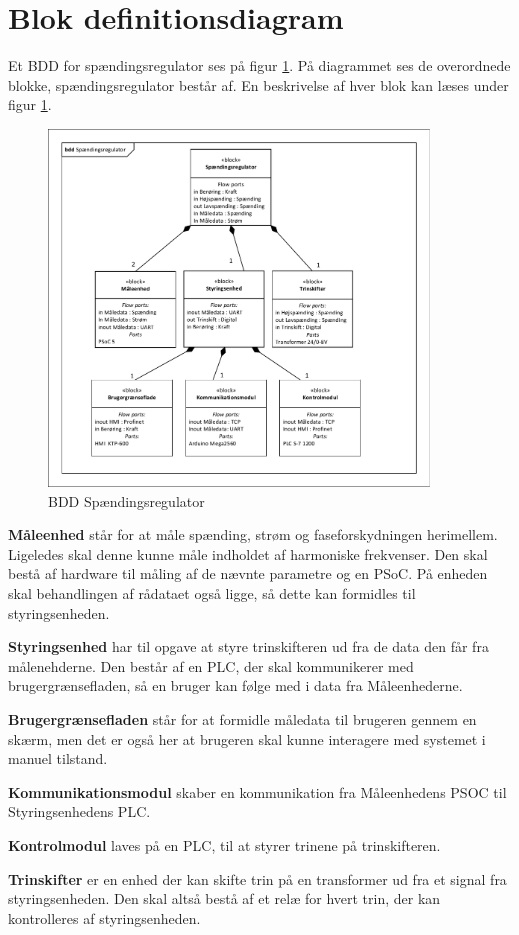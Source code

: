 
\section{Blok definitionsdiagram}
Et BDD for spændingsregulator ses på figur \ref{fig:BDDSpaendingsregulator}. På diagrammet ses de overordnede blokke, spændingsregulator består af. En beskrivelse af hver blok kan læses under figur \ref{fig:BDDSpaendingsregulator}.

\begin{figure}[htbp] %
	\centering
	\includegraphics[width=0.9\textwidth]{Figure/BDDSpaendingsregulator}
	\caption{BDD Spændingsregulator}
	\label{fig:BDDSpaendingsregulator}
\end{figure}

\textbf{Måleenhed} står for at måle spænding, strøm og faseforskydningen herimellem. Ligeledes skal denne kunne måle indholdet af harmoniske frekvenser. Den skal bestå af hardware til måling af de nævnte parametre og en PSoC. På enheden skal behandlingen af rådataet også ligge, så dette kan formidles til styringsenheden.

\textbf{Styringsenhed} har til opgave at styre trinskifteren ud fra de data den får fra målenehderne. Den består af en PLC, der skal kommunikerer med brugergrænsefladen, så en bruger kan følge med i data fra Måleenhederne.

\textbf{Brugergrænsefladen} står for at formidle måledata til brugeren gennem en skærm, men det er også her at brugeren skal kunne interagere med systemet i manuel tilstand.

\textbf{Kommunikationsmodul} skaber en kommunikation fra Måleenhedens PSOC til Styringsenhedens PLC.

\textbf{Kontrolmodul} laves på en PLC, til at styrer trinene på trinskifteren.






\textbf{Trinskifter} er en enhed der kan skifte trin på en transformer ud fra et signal fra styringsenheden. Den skal altså bestå af et relæ for hvert trin, der kan kontrolleres af styringsenheden.